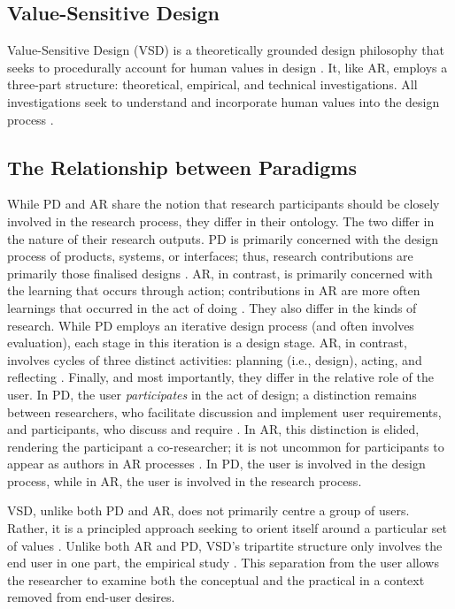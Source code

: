 \subsection{Value-Sensitive Design}\label{ssec:value_sensitive_design}
Value-Sensitive Design (VSD) is a theoretically grounded design philosophy that seeks to procedurally account for human values in design \cite{batyavalue}. It, like AR, employs a three-part structure: theoretical, empirical, and technical investigations. All investigations seek to understand and incorporate human values into the design process \cite{10.1145/242485.242493}.

\subsection{The Relationship between Paradigms}
While PD and AR share the notion that research participants should be closely involved in the research process, they differ in their ontology. The two differ in the nature of their research outputs. PD is primarily concerned with the design process of products, systems, or interfaces; thus, research contributions are primarily those finalised designs \cite{zimmerman_research_2014}. AR, in contrast, is primarily concerned with the learning that occurs through action; contributions in AR are more often learnings that occurred in the act of doing \cite{Hult1980TOWARDSAD}. They also differ in the kinds of research. While PD employs an iterative design process (and often involves evaluation), each stage in this iteration is a design stage. AR, in contrast, involves cycles of three distinct activities: planning (i.e., design), acting, and reflecting \cite{Hult1980TOWARDSAD}. Finally, and most importantly, they differ in the relative role of the user. In PD, the user \emph{participates} in the act of design; a distinction remains between researchers, who facilitate discussion and implement user requirements, and participants, who discuss and require \cite{Hussain2014OverviewOV}. In AR, this distinction is elided, rendering the participant a co-researcher; it is not uncommon for participants to appear as authors in AR processes \cite{Hayes_2011}. In PD, the user is involved in the design process, while in AR, the user is involved in the research process.

VSD, unlike both PD and AR, does not primarily centre a group of users. Rather, it is a principled approach seeking to orient itself around a particular set of values \cite{10.1145/242485.242493}. Unlike both AR and PD, VSD's tripartite structure only involves the end user in one part, the empirical study \cite{10.1145/242485.242493}. This separation from the user allows the researcher to examine both the conceptual and the practical in a context removed from end-user desires.

